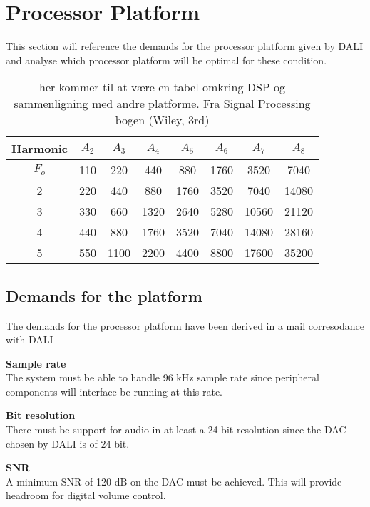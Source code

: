 \section{Processor Platform}
This section will reference the demands for the processor platform given by DALI and analyse which processor platform will be optimal for these condition. 

\begin{table}[H]
\centering
{}
\begin{tabular}{S[table-format=1]ccccccc} \toprule
    {Harmonic} & {$A_2$} & {$A_3$} & {$A_4$} & {$A_5$} & {$A_6$} & {$A_7$} & {$A_8$} \\ \midrule 
    $F_o$  & 110  & 220  & 440   & 880  & 1760   & 3520   & 7040   \\       & 220  & 440  & 880   & 1760 & 3520   & 7040   & 14080  \\ 
    3      & 330  & 660  & 1320  & 2640 & 5280   & 10560  & 21120  \\
    4      & 440  & 880  & 1760  & 3520 & 7040   & 14080  & 28160  \\ 
    5      & 550  & 1100 & 2200  & 4400 & 8800   & 17600  & 35200  \\ \bottomrule 
\end{tabular}
\caption{her kommer til at være en tabel omkring DSP og sammenligning med andre platforme. Fra Signal Processing bogen (Wiley, 3rd)}
\end{table}



\subsection*{Demands for the platform}
The demands for the processor platform have been derived in a mail corresodance with DALI 

\textbf{Sample rate} \\
The system must be able to handle 96 kHz sample rate since peripheral components will interface be running at this rate.

\textbf{Bit resolution} \\
There must be support for audio in at least a 24 bit resolution since the \gls{DAC} chosen by DALI is of 24 bit.

\textbf{\gls{SNR}} \\
A minimum \gls{SNR} of 120 dB on the \gls{DAC} must be achieved. This will provide headroom for digital volume control.

